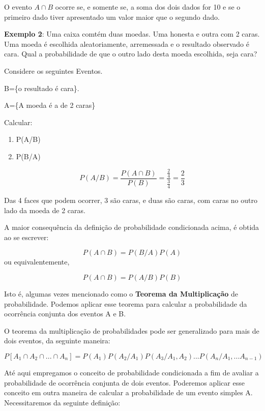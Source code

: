 O evento $A \cap B$ ocorre se, e somente se, a soma dos dois dados
for 10 e se o primeiro dado tiver apresentado um valor maior que o
segundo dado.\vskip0.3cm


\textbf{Exemplo 2}: Uma caixa comtém duas moedas. Uma honesta e
outra com 2 caras. Uma moeda é escolhida aleatoriamente,
arremessada e o resultado observado é cara. Qual a probabilidade
de que o outro lado desta moeda escolhida, seja cara?\vskip0.3cm

Considere os seguintes Eventos.\vskip0.3cm

B=\{o resultado é cara\}.

A=\{A moeda é a de 2 caras\}

\vskip0.3cm

Calcular:

\begin{enumerate}
    \item P(A/B)
    \item P(B/A)
\end{enumerate}


$$P(A/B)=\frac{P(A \cap
B)}{P(B)}=\frac{\frac{2}{4}}{\frac{3}{4}} = \frac{2}{3}$$

Das 4 faces que podem ocorrer, 3 são caras, e duas são caras, com
caras no outro lado da moeda de 2 caras.\vskip0.3cm


A maior consequência da definição de probabilidade condicionada
acima, é obtida ao se escrever:


$$
P(A \cap B)= P(B/A)P(A)
$$
 ou equivalentemente,

$$
P(A \cap B)= P(A/B)P(B)
$$

Isto é, algumas vezes mencionado como o \textbf{Teorema da
Multiplicação} de probabilidade. Podemos aplicar esse teorema para
calcular a probabilidade da ocorrência conjunta dos eventos A e B.
\vskip0.3cm

O teorema da multiplicação de probabilidades pode ser generalizado
para mais de dois eventos, da seguinte maneira:

\begin{equation}\label{}
    P[A_{1} \cap A_{2} \cap ... \cap A_{n}]=
    P(A_{1})P(A_{2}/A_{1})P(A_{3}/A_{1},A_{2})...P(A_{n}/A_{1},...A_{n-1})
\end{equation}

Até aqui empregamos o conceito de probabilidade condicionada a fim
de avaliar a probabilidade de ocorrência conjunta de dois eventos.
Poderemos aplicar esse conceito em outra maneira de calcular a
probabilidade de um evento simples A. Necessitaremos da seguinte
definição:\vskip0.3cm


